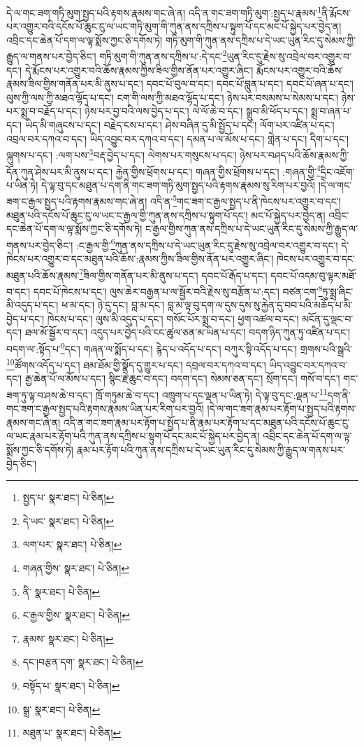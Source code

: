 དེ་ལ་གང་ཟག་གཏི་མུག་སྤྱད་པའི་རྟགས་རྣམས་གང་ཞེ་ན། འདི་ན་གང་ཟག་གཏི་མུག་:སྤྱད་པ་རྣམས་\footnote{སྤྱད་པ་  སྣར་ཐང་།  པེ་ཅིན། }ནི་རྨོངས་པར་འགྱུར་བའི་དངོས་པོ་ཆུང་ངུ་ལ་ཡང་གཏི་མུག་གི་ཀུན་ནས་དཀྲིས་པ་སྟུག་པོ་དང་མང་པོ་སྐྱེད་པར་བྱེད་ན། འབྲིང་དང་ཆེན་པོ་དག་ལ་ལྟ་སྨོས་ཀྱང་ཅི་དགོས་ཏེ། གཏི་མུག་གི་ཀུན་ནས་དཀྲིས་པ་དེ་ཡང་ཡུན་རིང་དུ་སེམས་ཀྱི་རྒྱུད་ལ་གནས་པར་བྱེད་ཅིང་། གཏི་མུག་གི་ཀུན་ནས་དཀྲིས་པ་:དེ་དང་\footnote{དེ་ཡང་  སྣར་ཐང་།  པེ་ཅིན། }ཡུན་རིང་དུ་རྗེས་སུ་འབྲེལ་བར་འགྱུར་བ་དང་། དེ་རྨོངས་པར་འགྱུར་བའི་ཆོས་རྣམས་ཀྱིས་ཟིལ་གྱིས་ནོན་པར་འགྱུར་ཞིང་། རྨོངས་པར་འགྱུར་བའི་ཆོས་རྣམས་ཟིལ་གྱིས་གནོན་པར་མི་ནུས་པ་དང་། དབང་པོ་བུལ་བ་དང་། དབང་པོ་བླུན་པ་དང་། དབང་པོ་ཞན་པ་དང་། ལུས་ཀྱི་ལས་ཀྱི་མཐའ་ལྷོད་པ་དང་། ངག་གི་ལས་ཀྱི་མཐའ་ལྷོད་པ་དང་། ཉེས་པར་བསམས་པ་སེམས་པ་དང་། ཉེས་པར་སྨྲ་བ་བརྗོད་པ་དང་། ཉེས་པར་བྱ་བའི་ལས་བྱེད་པ་དང་། ལེ་ལོ་ཆེ་བ་དང་། སྒྲུབ་མི་ཕོད་པ་དང་། སྨྲ་བ་ཞན་པ་དང་། ཡིད་མི་གཞུངས་པ་དང་། བརྗེད་ངས་པ་དང་། ཤེས་བཞིན་དུ་མི་སྤྱོད་པ་དང་། ལོག་པར་འཛིན་པ་དང་། འབྲལ་བར་དཀའ་བ་དང་། ཡིད་འབྱུང་བར་དཀའ་བ་དང་། དམན་པ་ལ་མོས་པ་དང་། གླེན་པ་དང་། དིག་པ་དང་། ལྐུགས་པ་དང་། :ལག་པས་\footnote{ལག་པར་  སྣར་ཐང་།  པེ་ཅིན། }བརྡ་བྱེད་པ་དང་། ལེགས་པར་གསུངས་པ་དང་། ཉེས་པར་བཤད་པའི་ཆོས་རྣམས་ཀྱི་དོན་ཀུན་ཤེས་པར་མི་ནུས་པ་དང་། རྐྱེན་གྱིས་ཕྲོགས་པ་དང་། གཞན་གྱིས་ཕྲོགས་པ་དང་། :གཞན་གྱི་\footnote{གཞན་གྱིས་  སྣར་ཐང་།  པེ་ཅིན། }དྲིང་འཇོག་པ་ཡིན་ཏེ། དེ་ལྟ་བུ་དང་མཐུན་པ་དག་ནི་གང་ཟག་གཏི་མུག་སྤྱད་པའི་རྟགས་རྣམས་སུ་རིག་པར་བྱའོ། །དེ་ལ་གང་ཟག་ང་རྒྱལ་སྤྱད་པའི་རྟགས་རྣམས་གང་ཞེ་ན། འདི་ན་\footnote{ནི་  སྣར་ཐང་།  པེ་ཅིན། }གང་ཟག་ང་རྒྱལ་སྤྱད་པ་ནི་ཁེངས་པར་འགྱུར་བ་དང་། མཐུན་པའི་དངོས་པོ་ཆུང་ངུ་ལ་ཡང་ང་རྒྱལ་གྱི་ཀུན་ནས་དཀྲིས་པ་སྟུག་པོ་དང་། མང་པོ་སྐྱེད་པར་བྱེད་ན། འབྲིང་དང་ཆེན་པོ་དག་ལ་ལྟ་སྨོས་ཀྱང་ཅི་དགོས་ཏེ། ང་རྒྱལ་གྱིས་ཀུན་ནས་དཀྲིས་པ་དེ་ཡང་ཡུན་རིང་དུ་སེམས་ཀྱི་རྒྱུད་ལ་གནས་པར་བྱེད་ཅིང་། :ང་རྒྱལ་གྱི་\footnote{ང་རྒྱལ་གྱིས་  སྣར་ཐང་།  པེ་ཅིན། }ཀུན་ནས་དཀྲིས་པ་དེ་ཡང་ཡུན་རིང་དུ་རྗེས་སུ་འབྲེལ་བར་འགྱུར་བ་དང་། དེ་ཁེངས་པར་འགྱུར་བ་དང་མཐུན་པའི་ཆོས་:རྣམས་ཀྱིས་ཟིལ་གྱིས་ནོན་པར་འགྱུར་ཞིང་། ཁེངས་པར་འགྱུར་བ་དང་མཐུན་པའི་ཆོས་རྣམས་\footnote{རྣམས་  སྣར་ཐང་།  པེ་ཅིན། }ཟིལ་གྱིས་གནོན་པར་མི་ནུས་པ་དང་། དབང་པོ་རྒོད་པ་དང་། དབང་པོ་འདམ་བུ་ལྟར་མཐོ་བ་དང་། དབང་པོ་ཁེངས་པ་དང་། ལུས་ཆེར་བརྒྱན་པ་ལ་སྦྱོར་བའི་རྗེས་སུ་བརྩོན་པ་:དང་། བཙན་ངག་\footnote{དང་།བརྩན་དག་  སྣར་ཐང་།  པེ་ཅིན། }ཏུ་སྨྲ་ཞིང་མི་འདུད་པ་དང་། ཕ་མ་དང་། ཉེ་དུ་དང་། བླ་མ་དང་། བླ་མ་ལྟ་བུ་དག་ལ་དུས་དུས་སུ་རྐྱེན་དུ་བབ་པའི་མཆོད་པ་མི་བྱེད་པ་དང་། ཁེངས་པ་དང་། ལུས་མི་འདུད་པ་དང་། གསོང་པོར་སྨྲ་བ་དང་། ཕྱག་འཚལ་བ་དང་། མངོན་དུ་ལྡང་བ་དང་། ཐལ་མོ་སྦྱོར་བ་དང་། འདུད་པར་བྱེད་པའི་ངང་ཚུལ་ཅན་མ་ཡིན་པ་དང་། བདག་ཉིད་ཀུན་ཏུ་འཛིན་པ་དང་། བདག་ལ་:སྟོད་པ་\footnote{བསྟོད་པ་  སྣར་ཐང་།  པེ་ཅིན། }དང་། གཞན་ལ་སྨོད་པ་དང་། རྙེད་པ་འདོད་པ་དང་། བཀུར་སྟི་འདོད་པ་དང་། གྲགས་པའི་སྒྲའི་\footnote{སྒྲ་  སྣར་ཐང་།  པེ་ཅིན། }ཚོགས་འདོད་པ་དང་། ཐམ་ཐོམ་གྱི་སྣོད་དུ་གྱུར་པ་དང་། དབྲལ་བར་དཀའ་བ་དང་། ཡིད་འབྱུང་བར་དཀའ་བ་དང་། རྒྱ་ཆེན་པོ་ལ་མོས་པ་དང་། སྙིང་རྗེ་ཆུང་བ་དང་། བདག་དང་། སེམས་ཅན་དང་། སྲོག་དང་། གསོ་བ་དང་། གང་ཟག་ཏུ་ལྟ་བ་ཤས་ཆེ་བ་དང་། ཁྲོ་གཏུམ་ཆེ་བ་དང་། འཁྲུག་པ་དང་ལྡན་པ་ཡིན་ཏེ། དེ་ལྟ་བུ་དང་:ལྡན་པ་\footnote{མཐུན་པ་  སྣར་ཐང་།  པེ་ཅིན། }དག་ནི་གང་ཟག་ང་རྒྱལ་སྤྱད་པའི་རྟགས་རྣམས་ཡིན་པར་རིག་པར་བྱའོ། །དེ་ལ་གང་ཟག་རྣམ་པར་རྟོག་པ་སྤྱད་པའི་རྟགས་རྣམས་གང་ཞེ་ན། འདི་ན་གང་ཟག་རྣམ་པར་རྟོག་པ་སྤྱོད་པ་ནི་རྣམ་པར་རྟོག་པ་དང་མཐུན་པའི་དངོས་པོ་ཆུང་ངུ་ལ་ཡང་རྣམ་པར་རྟོག་པའི་ཀུན་ནས་དཀྲིས་པ་སྟུག་པོ་དང་མང་པོ་སྐྱེད་པར་བྱེད་ན། འབྲིང་དང་ཆེན་པོ་དག་ལ་ལྟ་སྨོས་ཀྱང་ཅི་དགོས་ཏེ། རྣམ་པར་རྟོག་པའི་ཀུན་ནས་དཀྲིས་པ་དེ་ཡང་ཡུན་རིང་དུ་སེམས་ཀྱི་རྒྱུད་ལ་གནས་པར་བྱེད་ཅིང་། 